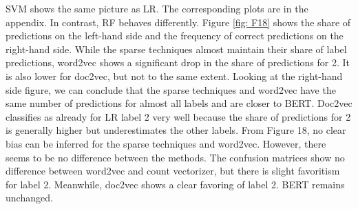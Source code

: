 \documentclass[12pt, a4paper, titlepage]{article}
\begin{document}
\ac{SVM} shows the same picture as \ac{LR}. The corresponding plots are in the appendix. In contrast, \ac{RF} behaves differently. Figure \ref{fig: F18} shows the share of predictions on the left-hand side and the frequency of correct predictions on the right-hand side. While the sparse techniques almost maintain their share of label predictions, word2vec shows a significant drop in the share of predictions for 2. It is also lower for doc2vec, but not to the same extent. Looking at the right-hand side figure, we can conclude that the sparse techniques and word2vec have the same number of predictions for almost all labels and are closer to BERT. Doc2vec classifies as already for LR label 2 very well because the share of predictions for 2 is generally higher but underestimates the other labels. From Figure 18, no clear bias can be inferred for the sparse techniques and word2vec. However, there seems to be no difference between the methods. The confusion matrices show no difference between word2vec and count vectorizer, but there is slight favoritism for label 2. Meanwhile, doc2vec shows a clear favoring of label 2. BERT remains unchanged.
\end{document}
